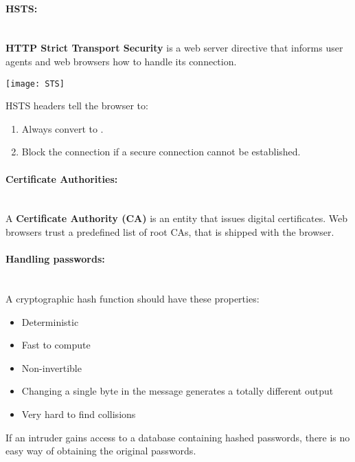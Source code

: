 \documentclass[../ESOF_notes.tex]{subfiles}
\begin{document}
\paragraph{HSTS:}\mbox{}\\

\textbf{HTTP Strict Transport Security} is a web server directive that informs user agents and web browsers how to handle its connection.

\begin{center}
    \texttt{[image: STS]}
\end{center}

HSTS headers tell the browser to:
\begin{enumerate}
    \item Always convert  to .
    \item Block the connection if a secure connection cannot be established.
\end{enumerate}

\paragraph{Certificate Authorities:}\mbox{}\\

A \textbf{Certificate Authority (CA)} is an entity that issues digital certificates. Web browsers trust a predefined list of root CAs, that is shipped with the browser.

\paragraph{Handling passwords:}\mbox{}\\

A cryptographic hash function should have these properties:

\begin{itemize}
    \item Deterministic
    \item Fast to compute
    \item Non-invertible
    \item Changing a single byte in the message generates a totally different output
    \item Very hard to find collisions
\end{itemize}

If an intruder gains access to a database containing hashed passwords, there is no easy way of obtaining the original passwords.
\end{document}
